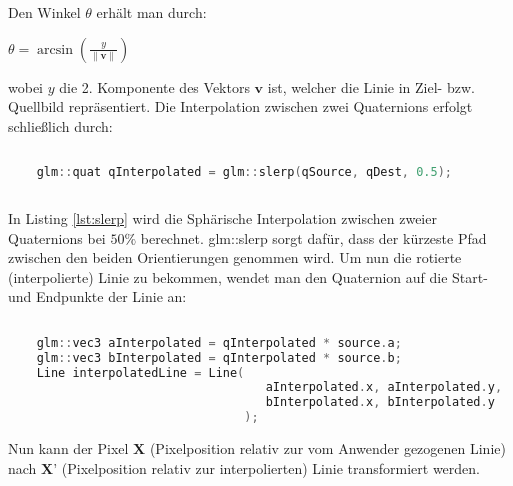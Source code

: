 Den Winkel $\theta$ erhält man durch:

$\theta = \arcsin \left(\frac{y}{\|\textbf{v}\|}\right)$

wobei $y$ die 2. Komponente des Vektors $\textbf{v}$ ist, welcher die Linie in Ziel- bzw. Quellbild repräsentiert.
Die Interpolation zwischen zwei Quaternions erfolgt schlie\ss lich durch:
\begin{lstlisting}[language=C++, caption=Spherical interpolation zwischen zwei Quaternions, label={lst:slerp}, xleftmargin=0.5cm]
	
	glm::quat qInterpolated = glm::slerp(qSource, qDest, 0.5);
	
\end{lstlisting}
In Listing \ref{lst:slerp} wird die Sphärische Interpolation zwischen
zweier Quaternions bei $50\%$ berechnet.
glm::slerp sorgt dafür, dass der kürzeste Pfad zwischen
den beiden Orientierungen genommen wird. Um nun die rotierte (interpolierte)
Linie zu bekommen, wendet man den Quaternion auf die Start- und Endpunkte der
Linie an:
\begin{lstlisting}[language=C++, caption=Rotation der Quelllinie durch einen Quaternion, label={lst:quattimespoint}, xleftmargin=0.5cm]
	
	glm::vec3 aInterpolated = qInterpolated * source.a;
	glm::vec3 bInterpolated = qInterpolated * source.b;
	Line interpolatedLine = Line(
									aInterpolated.x, aInterpolated.y, 
									bInterpolated.x, bInterpolated.y
								 );	
\end{lstlisting}
Nun kann der Pixel $\textbf{X}$ (Pixelposition relativ zur vom Anwender gezogenen Linie) nach $\textbf{X'}$ (Pixelposition relativ zur interpolierten) Linie transformiert werden.



